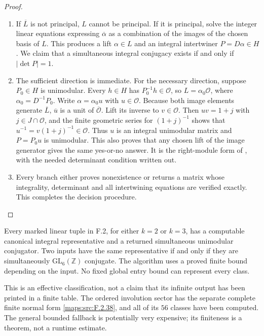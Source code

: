\begin{proof}
\begin{enumerate}[label=\arabic*.]
\item If $\overline L$ is not principal, $L$ cannot be principal. If it is
principal, solve the integer linear equations expressing
$\overline\alpha$ as a combination of the images of the chosen basis
of $L$. This produces a lift $\alpha\in L$ and an integral
intertwiner $P=D\alpha\in H$. We claim that a simultaneous integral
conjugacy exists if and only if $|\det P|=1$.

\item The sufficient direction is immediate. For the necessary direction,
suppose $P_0\in H$ is unimodular. Every $h\in H$ has
$P_0^{-1}h\in\mathcal O$, so
$L=\alpha_0\mathcal O$, where $\alpha_0=D^{-1}P_0$.
Write $\alpha=\alpha_0u$ with $u\in\mathcal O$.
Because both image elements generate $\overline L$,
$\overline u$ is a unit of $\overline{\mathcal O}$.
Lift its inverse to $v\in\mathcal O$. Then $uv=1+j$ with
$j\in J\cap\mathcal O$, and the finite geometric series for
$(1+j)^{-1}$ shows that $u^{-1}=v(1+j)^{-1}\in\mathcal O$.
Thus $u$ is an integral unimodular matrix and
$P=P_0u$ is unimodular. This also proves that any chosen lift of the
image generator gives the same yes-or-no answer. It is the
right-module form of \cite[Theorem 3.4, p.~6; Propositions 8.1--8.2, p.~21]{rootBHJ22},
with the needed determinant condition written out.

\item Every branch either proves nonexistence or returns a matrix whose
integrality, determinant and all intertwining equations are verified
exactly. This completes the decision procedure.

\end{enumerate}
\end{proof}




\begin{theorem}\label{maps:src:F.2.37}


Every marked linear tuple in F.2, for either $k=2$ or $k=3$,
has a computable canonical integral representative and a
returned simultaneous unimodular conjugator. Two inputs have
the same representative if and only if they are simultaneously
$\mathrm{GL}_6(\mathbb Z)$ conjugate. The algorithm uses a proved
finite bound depending on the input. No fixed global entry bound
can represent every class.

This is an effective classification, not a claim that its
infinite output has been printed in a finite table. The
ordered involution sector has the separate complete finite
normal form \ref{maps:src:F.2.38}, and all of its $56$ classes have been
computed. The general bounded fallback is potentially very
expensive; its finiteness is a theorem, not a runtime estimate.

\end{theorem}


